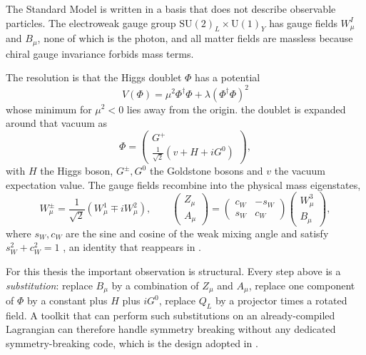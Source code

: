 The Standard Model is written in a basis that does not describe observable
particles. The electroweak gauge group $\mathrm{SU}(2)_L\times
\mathrm{U}(1)_Y$ has gauge fields $W^I_\mu$ and $B_\mu$, none of which is the
photon, and all matter fields are massless because chiral gauge invariance
forbids mass terms.

The resolution is that the Higgs doublet $\Phi$ has a potential
\begin{equation}
    V(\Phi) = \mu^2 \Phi^\dagger\Phi + \lambda (\Phi^\dagger\Phi)^2
\end{equation}
whose minimum for $\mu^2<0$ lies away from the origin. the doublet is expanded around that vacuum as
\begin{equation}
    \Phi = \begin{pmatrix} G^+ \\
      \tfrac{1}{\sqrt2}\left(v + H + i G^0\right) \end{pmatrix} ,
    \label{eq:theory-vev}
\end{equation}
with $H$ the Higgs boson, $G^\pm, G^0$ the Goldstone bosons and $v$ the
vacuum expectation value. The gauge fields recombine into the physical mass
eigenstates,
\begin{equation}
    W^\pm_\mu = \frac{1}{\sqrt2}\left(W^1_\mu \mp i W^2_\mu\right),
    \qquad
    \begin{pmatrix} Z_\mu \\ A_\mu \end{pmatrix}
    =
    \begin{pmatrix} c_W & -s_W \\ s_W & c_W \end{pmatrix}
    \begin{pmatrix} W^3_\mu \\ B_\mu \end{pmatrix},
    \label{eq:theory-mixing}
\end{equation}
where $s_W, c_W$ are the sine and cosine of the weak mixing angle and satisfy
$s_W^2 + c_W^2 = 1$ , an identity that reappears in
.

For this thesis the important observation is structural. Every step above is
a \emph{substitution}: replace $B_\mu$ by a combination of $Z_\mu$ and
$A_\mu$, replace one component of $\Phi$ by a constant plus $H$ plus $iG^0$,
replace $Q_L$ by a projector times a rotated field. A toolkit that can
perform such substitutions on an already-compiled Lagrangian can therefore
handle symmetry breaking without any dedicated symmetry-breaking code, which
is the design adopted in .

